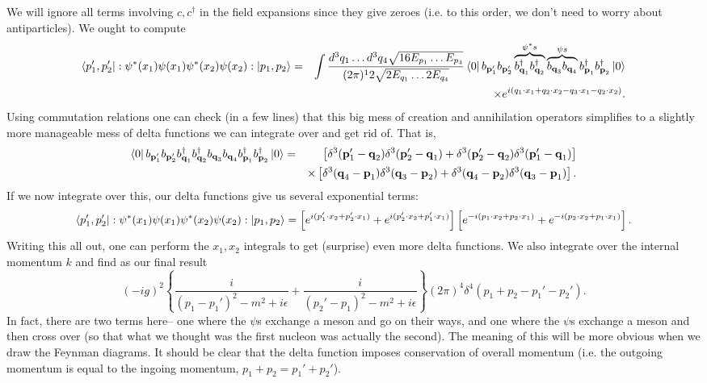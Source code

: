 We will ignore all terms involving $c,c^\dagger$ in the field expansions since they give zeroes (i.e. to this order, we don't need to worry about antiparticles). We ought to compute
\begin{eqnarray*}
\left< p_1',p_2' \right|:\psi^*(x_1)\psi(x_1)\psi^*(x_2)\psi(x_2):\left| p_1,p_2 \right>&=&\int \frac{d^3 q_1 \ldots d^3 q_4 \sqrt{16 E_{p_1}\ldots E_{p_4}}}{(2\pi)^12 \sqrt{2E_{q_1}\ldots 2E_{q_4}}} 
\left< 0 \right|b_{\boldsymbol{\mathbf{p}}_1'} b_{\boldsymbol{\mathbf{p}}_2'} \overbrace{b_{\boldsymbol{\mathbf{q}}_1}^\dagger b_{\boldsymbol{\mathbf{q}}_2}^\dagger}^{\psi^*s} \overbrace{b_{\boldsymbol{\mathbf{q}}_3} b_{\boldsymbol{\mathbf{q}}_4}}^{\psi s} b_{\boldsymbol{\mathbf{p}}_1}^\dagger b_{\boldsymbol{\mathbf{p}}_2}^\dagger \left| 0 \right>\\
&&\times e^{i(q_1\cdot x_1 +q_2 \cdot x_2-q_3 \cdot x_1 -q_2 \cdot x_2)}.
\end{eqnarray*}
Using commutation relations one can check (in a few lines) that this big mess of creation and annihilation operators simplifies to a slightly more manageable mess of delta functions we can integrate over and get rid of. That is,
\begin{eqnarray*}
\left< 0 \right|b_{\boldsymbol{\mathbf{p}}_1'} b_{\boldsymbol{\mathbf{p}}_2'} {b_{\boldsymbol{\mathbf{q}}_1}^\dagger b_{\boldsymbol{\mathbf{q}}_2}^\dagger} {b_{\boldsymbol{\mathbf{q}}_3} b_{\boldsymbol{\mathbf{q}}_4}} b_{\boldsymbol{\mathbf{p}}_1}^\dagger b_{\boldsymbol{\mathbf{p}}_2}^\dagger \left| 0 \right>&=&\left[ \delta^3(\boldsymbol{\mathbf{p}}_1'-\boldsymbol{\mathbf{q}}_2)\delta^3(\boldsymbol{\mathbf{p}}_2'-\boldsymbol{\mathbf{q}}_1)+\delta^3(\boldsymbol{\mathbf{p}}_2'-\boldsymbol{\mathbf{q}}_2)\delta^3 (\boldsymbol{\mathbf{p}}_1' - \boldsymbol{\mathbf{q}}_1)\right]\\
&&\times \left[\delta^3 (\boldsymbol{\mathbf{q}}_4-\boldsymbol{\mathbf{p}}_1)\delta^3 (\boldsymbol{\mathbf{q}}_3-\boldsymbol{\mathbf{p}}_2)+\delta^3(\boldsymbol{\mathbf{q}}_4-\boldsymbol{\mathbf{p}}_2)\delta^3(\boldsymbol{\mathbf{q}}_3 - \boldsymbol{\mathbf{p}}_1)\right].
\end{eqnarray*}
If we now integrate over this, our delta functions give us several exponential terms:
$$\left< p_1', p_2' \right|:\psi^*(x_1)\psi(x_1)\psi^*(x_2)\psi(x_2):\left| p_1,p_2 \right>=\left[e^{i(p_1'\cdot x_2 +p_2' \cdot x_1)}+e^{i(p_2'\cdot x_2 + p_1'\cdot x_1)}\right]\left[e^{-i(p_1\cdot x_2 +p_2 \cdot x_1)}+e^{-i(p_2\cdot x_2 + p_1\cdot x_1)}\right].$$
Writing this all out, one can perform the $x_1,x_2$ integrals to get (surprise) even more delta functions. We also integrate over the internal momentum $k$ and find as our final result
$$(-ig)^2 \left\{\frac{i}{(p_1-p_1')^2-m^2+i\epsilon}+\frac{i}{(p_2'-p_1)^2-m^2+i\epsilon}\right\} (2\pi)^4\delta^4(p_1+p_2-p_1'-p_2').$$
In fact, there are two terms here-- one where the $\psi$s exchange a meson and go on their ways, and one where the $\psi$s exchange a meson and then cross over (so that what we thought was the first nucleon was actually the second). The meaning of this will be more obvious when we draw the Feynman diagrams. It should be clear that the delta function imposes conservation of overall momentum (i.e. the outgoing momentum is equal to the ingoing momentum, $p_1+p_2=p_1'+p_2'$).

